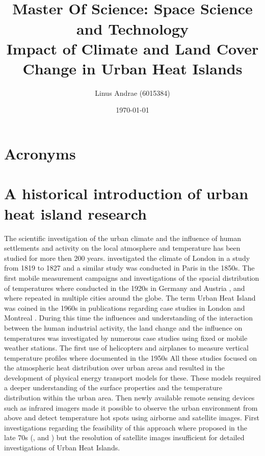 \documentclass[a4paper, english]{article}
\title{\textit{} \\ \vspace{1cm}Master Of Science: Space Science and Technology\\ \vspace{1cm} \textbf{\huge Impact of Climate and Land Cover Change in Urban Heat Islands}\\ \vspace{1.2cm} }
\author{Linus Andrae (6015384)}
\date{\today}
\begin{document}
  
  \newpage

  
  \newpage

  \tableofcontents
  \listoffigures
  \listoftables

  \section*{Acronyms}
  \printglossaries%
\newpage

\section{A historical introduction of urban heat island research}
  The scientific investigation of the urban climate and the influence of human settlements and activity on the local atmosphere and temperature has been studied for more then 200 years. 
  \cite{Howard1833} investigated the climate of London in a study from 1819 to 1827 and a similar study was conducted in Paris in the 1850s\cite{renou1862differences}. 
  The first mobile measurement campaigns\cite{peppler1929auto} and investigations of the spacial distribution of temperatures where conducted in the 1920s in Germany and Austria \cite{tollner1932untersuchungen}, and where repeated in multiple cities around the globe. %
  The term Urban Heat Island was coined in the 1960s in publications regarding case studies in London\cite{Chandler1961} and Montreal \cite{Oke1968}.
  During this time the influences and understanding of the interaction between the human industrial activity, the land change and the influence on temperatures was investigated by numerous case studies using fixed or mobile weather stations. 
  The first use of helicopters and airplanes to measure vertical temperature profiles where documented in the 1950s 
  All these studies focused on the atmospheric heat distribution over urban areas and resulted in the development of physical energy transport models for these. 
  These models required a deeper understanding of the surface properties and the temperature distribution within the urban area. 
  Then newly available remote sensing devices such as infrared imagers made it possible to observe the urban environment from above and detect temperature hot spots using airborne and satellite images.  
  First investigations regarding the feasibility of this approach where proposed in the late 70s (\cite{Watson1975}, \cite{Carlson1977} and \cite{Block1978}) but the resolution of satellite images insufficient for detailed investigations of Urban Heat Islands.
\end{document}
